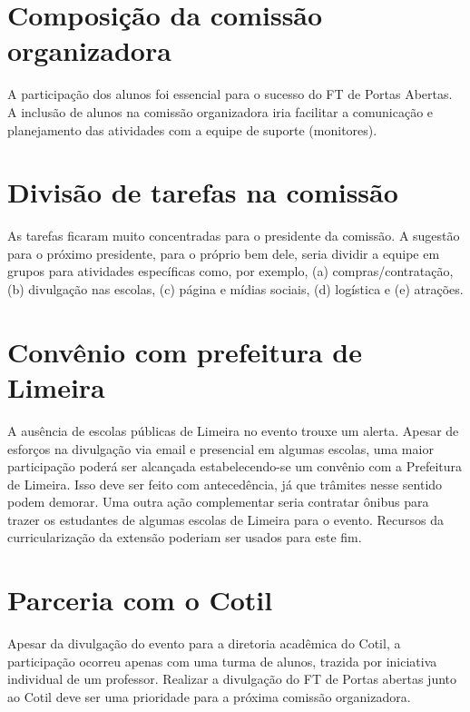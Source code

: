 \documentclass[
  letterpaper,
  DIV=11,
  numbers=noendperiod]{scrreprt}
\begin{document}
\section{Composição da comissão
organizadora}\label{composiuxe7uxe3o-da-comissuxe3o-organizadora}

A participação dos alunos foi essencial para o sucesso do FT de Portas
Abertas. A inclusão de alunos na comissão organizadora iria facilitar a
comunicação e planejamento das atividades com a equipe de suporte
(monitores).

\section{Divisão de tarefas na
comissão}\label{divisuxe3o-de-tarefas-na-comissuxe3o}

As tarefas ficaram muito concentradas para o presidente da comissão. A
sugestão para o próximo presidente, para o próprio bem dele, seria
dividir a equipe em grupos para atividades específicas como, por
exemplo, (a) compras/contratação, (b) divulgação nas escolas, (c) página
e mídias sociais, (d) logística e (e) atrações.

\section{Convênio com prefeitura de
Limeira}\label{convuxeanio-com-prefeitura-de-limeira}

A ausência de escolas públicas de Limeira no evento trouxe um alerta.
Apesar de esforços na divulgação via email e presencial em algumas
escolas, uma maior participação poderá ser alcançada estabelecendo-se um
convênio com a Prefeitura de Limeira. Isso deve ser feito com
antecedência, já que trâmites nesse sentido podem demorar. Uma outra
ação complementar seria contratar ônibus para trazer os estudantes de
algumas escolas de Limeira para o evento. Recursos da curricularização
da extensão poderiam ser usados para este fim.

\section{Parceria com o Cotil}\label{parceria-com-o-cotil}

Apesar da divulgação do evento para a diretoria acadêmica do Cotil, a
participação ocorreu apenas com uma turma de alunos, trazida por
iniciativa individual de um professor. Realizar a divulgação do FT de
Portas abertas junto ao Cotil deve ser uma prioridade para a próxima
comissão organizadora.
\end{document}

